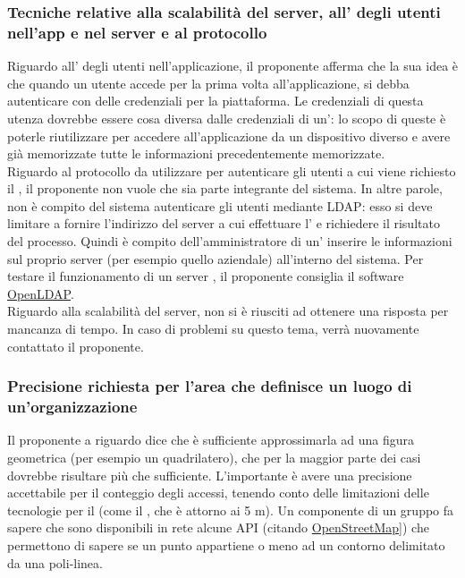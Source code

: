 \subsubsection*{Tecniche relative alla scalabilità del server, all' degli utenti nell'app e nel server e al protocollo }
Riguardo all' degli utenti nell'applicazione, il proponente afferma che la sua idea è che quando un utente accede per la prima volta all'applicazione, si debba autenticare con delle credenziali per la piattaforma.
Le credenziali di questa utenza dovrebbe essere cosa diversa dalle credenziali di un': lo scopo di queste è poterle riutilizzare per accedere all'applicazione da un dispositivo diverso e avere già
memorizzate tutte le informazioni precedentemente memorizzate.\\
Riguardo al protocollo  da utilizzare per autenticare gli utenti a cui viene richiesto il , il proponente non vuole che sia parte integrante del sistema.
In altre parole, non è compito del sistema autenticare gli utenti mediante LDAP: esso si deve limitare a fornire l'indirizzo del server a cui effettuare l' e richiedere il risultato del processo.
Quindi è compito dell'amministratore di un' inserire le informazioni sul proprio server  (per esempio quello aziendale) all'interno del sistema.
Per testare il funzionamento di un server , il proponente consiglia il software \href{https://www.openldap.org/}{OpenLDAP}.\\
Riguardo alla scalabilità del server, non si è riusciti ad ottenere una risposta per mancanza di tempo. In caso di problemi su questo tema, verrà nuovamente contattato il proponente.

\subsubsection*{Precisione richiesta per l'area che definisce un luogo di un'organizzazione}
Il proponente a riguardo dice che è sufficiente approssimarla ad una figura geometrica (per esempio un quadrilatero), che per la maggior parte dei casi dovrebbe risultare più che sufficiente.
L'importante è avere una precisione accettabile per il conteggio degli accessi, tenendo conto delle limitazioni delle tecnologie per il (come il , che è attorno ai 5 m).
Un componente di un gruppo fa sapere che sono disponibili in rete alcune API (citando \href{https://www.openstreetmap.org/}{OpenStreetMap]}) che permettono di sapere se un punto appartiene o meno ad un contorno delimitato da una poli-linea.

